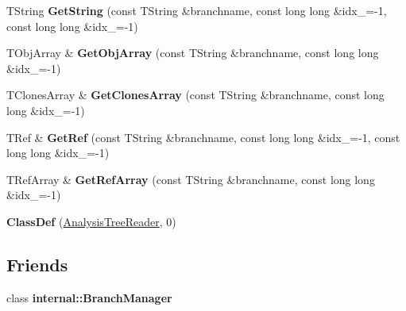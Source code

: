 \begin{DoxyCompactItemize}
\item 
\hypertarget{class_h_a_l_1_1_analysis_tree_reader_a75c0fe7d907ac8f1792ff496e4cf0b73}{T\+String {\bfseries Get\+String} (const T\+String \&branchname, const long long \&idx\+\_=-\/1, const long long \&idx\+\_=-\/1)}\label{class_h_a_l_1_1_analysis_tree_reader_a75c0fe7d907ac8f1792ff496e4cf0b73}

\item 
\hypertarget{class_h_a_l_1_1_analysis_tree_reader_ad44870dd8478b8d404ede307726f2db6}{T\+Obj\+Array \& {\bfseries Get\+Obj\+Array} (const T\+String \&branchname, const long long \&idx\+\_=-\/1)}\label{class_h_a_l_1_1_analysis_tree_reader_ad44870dd8478b8d404ede307726f2db6}

\item 
\hypertarget{class_h_a_l_1_1_analysis_tree_reader_ae9115ce6bba555009b6b21eca20339c9}{T\+Clones\+Array \& {\bfseries Get\+Clones\+Array} (const T\+String \&branchname, const long long \&idx\+\_=-\/1)}\label{class_h_a_l_1_1_analysis_tree_reader_ae9115ce6bba555009b6b21eca20339c9}

\item 
\hypertarget{class_h_a_l_1_1_analysis_tree_reader_af010b9fafb8bd7f06efcaa46d1360253}{T\+Ref \& {\bfseries Get\+Ref} (const T\+String \&branchname, const long long \&idx\+\_=-\/1, const long long \&idx\+\_=-\/1)}\label{class_h_a_l_1_1_analysis_tree_reader_af010b9fafb8bd7f06efcaa46d1360253}

\item 
\hypertarget{class_h_a_l_1_1_analysis_tree_reader_a66bc43933f69938b94dd8caf5277395c}{T\+Ref\+Array \& {\bfseries Get\+Ref\+Array} (const T\+String \&branchname, const long long \&idx\+\_=-\/1)}\label{class_h_a_l_1_1_analysis_tree_reader_a66bc43933f69938b94dd8caf5277395c}

\item 
\hypertarget{class_h_a_l_1_1_analysis_tree_reader_ad8be72de7b7f4ae5ced82c636ac91dd1}{{\bfseries Class\+Def} (\hyperlink{class_h_a_l_1_1_analysis_tree_reader}{Analysis\+Tree\+Reader}, 0)}\label{class_h_a_l_1_1_analysis_tree_reader_ad8be72de7b7f4ae5ced82c636ac91dd1}

\end{DoxyCompactItemize}
\subsection*{Friends}
\begin{DoxyCompactItemize}
\item 
\hypertarget{class_h_a_l_1_1_analysis_tree_reader_a3da00472573022c08436f19e0a48d8de}{class {\bfseries internal\+::\+Branch\+Manager}}\label{class_h_a_l_1_1_analysis_tree_reader_a3da00472573022c08436f19e0a48d8de}

\end{DoxyCompactItemize}


